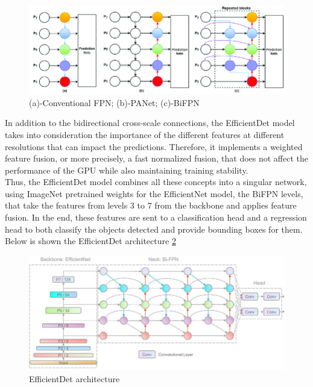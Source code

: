 \begin{figure}[!ht]
    \centering
    \includegraphics[width=1\textwidth]{figures/Figure6.png}
    \caption{(a)-Conventional FPN; (b)-PANet; (c)-BiFPN}
    \label{fig:fig6}
\end{figure}
In addition to the bidirectional cross-scale connections, the EfficientDet model takes into consideration the importance of the different features at different resolutions that can impact the predictions. Therefore, it implements a weighted feature fusion, or more precisely, a fast normalized fusion, that does not affect the performance of the GPU while also maintaining training stability.~\cite{carte8}\\
Thus, the EfficientDet model combines all these concepts into a singular network, using ImageNet pretrained weights for the EfficientNet model, the BiFPN levels, that take the features from levels 3 to 7 from the backbone and applies feature fusion. In the end, these features are sent to a classification head and a regression head to both classify the objects detected and provide bounding boxes for them. Below is shown the EfficientDet architecture \ref{fig:fig7}\\
\begin{figure}[!ht]
    \centering
    \includegraphics[width=1\textwidth]{figures/Figure7.jpg}
    \caption{EfficientDet architecture}
    \label{fig:fig7}
\end{figure}